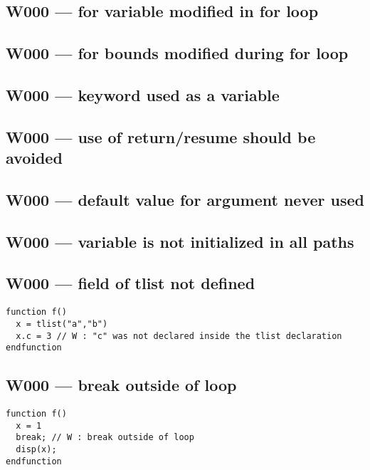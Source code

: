 \subsection{W000 --- for variable modified in for loop}




\subsection{W000 --- for bounds modified during for loop}




\subsection{W000 --- keyword used as a variable}




\subsection{W000 --- use of return/resume should be avoided}




\subsection{W000 --- default value for argument never used}




\subsection{W000 --- variable is not initialized in all paths}




\subsection{W000 --- field of tlist not defined}


\begin{verbatim}
function f()
  x = tlist("a","b")
  x.c = 3 // W : "c" was not declared inside the tlist declaration
endfunction
\end{verbatim}


\subsection{W000 --- break outside of loop}


\begin{verbatim}
function f()
  x = 1
  break; // W : break outside of loop
  disp(x);
endfunction
\end{verbatim}


